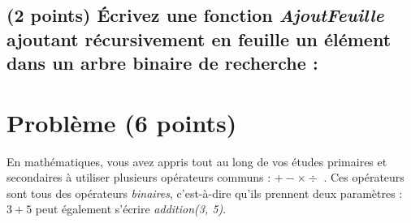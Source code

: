 \documentclass[11pt,a4paper]{article}
\begin{document}
%
%

\subsection{(2 points) \'Ecrivez une fonction \textit{AjoutFeuille} ajoutant récursivement en feuille un élément dans un arbre binaire de recherche : }

\begin{center}
\end{center}

\clearpage



\clearpage


\section{Problème (6 points)}



\noindent En mathématiques, vous avez appris tout au long de vos études primaires et secondaires à utiliser plusieurs opérateurs communs : \og $ + - \times \div $ \fg{}.
Ces opérateurs sont tous des opérateurs \textit{binaires}, c'est-à-dire qu'ils prennent deux paramètres : \og $ 3 + 5 $ \fg{} peut également s'écrire \textit{addition(3, 5)}.
\end{document}
